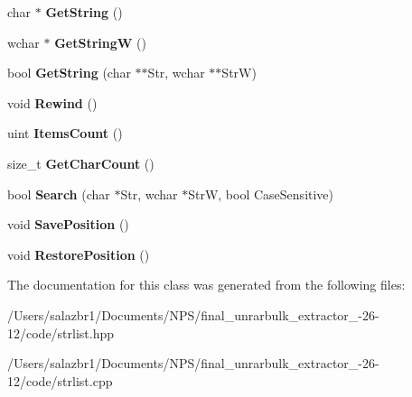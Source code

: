 \begin{DoxyCompactItemize}
\item 
\hypertarget{class_string_list_a8ce858075112fbc5c2b7b814583a7dbe}{char $\ast$ {\bfseries Get\-String} ()}\label{class_string_list_a8ce858075112fbc5c2b7b814583a7dbe}

\item 
\hypertarget{class_string_list_af1352147021fc1455e68f962c589fcc8}{wchar $\ast$ {\bfseries Get\-String\-W} ()}\label{class_string_list_af1352147021fc1455e68f962c589fcc8}

\item 
\hypertarget{class_string_list_a396bcb354ab0dab47532a703bad62834}{bool {\bfseries Get\-String} (char $\ast$$\ast$Str, wchar $\ast$$\ast$Str\-W)}\label{class_string_list_a396bcb354ab0dab47532a703bad62834}

\item 
\hypertarget{class_string_list_a5141a3a9babf5fa7b488e0351c2c074f}{void {\bfseries Rewind} ()}\label{class_string_list_a5141a3a9babf5fa7b488e0351c2c074f}

\item 
\hypertarget{class_string_list_aa7af0e4098ea677cbdcadd061749fad4}{uint {\bfseries Items\-Count} ()}\label{class_string_list_aa7af0e4098ea677cbdcadd061749fad4}

\item 
\hypertarget{class_string_list_ad93731924716e97eac58e7f78616eb54}{size\-\_\-t {\bfseries Get\-Char\-Count} ()}\label{class_string_list_ad93731924716e97eac58e7f78616eb54}

\item 
\hypertarget{class_string_list_a3b87fa661a10de116b87f9c2023f154b}{bool {\bfseries Search} (char $\ast$Str, wchar $\ast$Str\-W, bool Case\-Sensitive)}\label{class_string_list_a3b87fa661a10de116b87f9c2023f154b}

\item 
\hypertarget{class_string_list_afb00ef6bf5dc0f62911f6c2ca92bbeb5}{void {\bfseries Save\-Position} ()}\label{class_string_list_afb00ef6bf5dc0f62911f6c2ca92bbeb5}

\item 
\hypertarget{class_string_list_a210e5a7bf506e3a41d443664f7fc35a5}{void {\bfseries Restore\-Position} ()}\label{class_string_list_a210e5a7bf506e3a41d443664f7fc35a5}

\end{DoxyCompactItemize}


The documentation for this class was generated from the following files\-:\begin{DoxyCompactItemize}
\item 
/\-Users/salazbr1/\-Documents/\-N\-P\-S/final\-\_\-unrarbulk\-\_\-extractor\-\_-\/26-\/12/code/strlist.\-hpp\item 
/\-Users/salazbr1/\-Documents/\-N\-P\-S/final\-\_\-unrarbulk\-\_\-extractor\-\_-\/26-\/12/code/strlist.\-cpp\end{DoxyCompactItemize}
